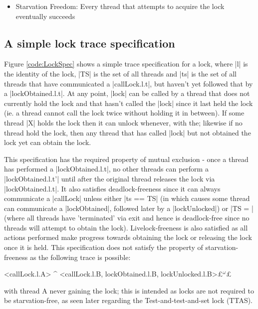 \begin{itemize}
\begin{cspm}
  \end{cspm}
  \item Starvation Freedom: Every thread that attempts to acquire the lock eventually succeeds 
  
\end{itemize}

\subsection{A simple lock trace specification}

Figure \ref{code:LockSpec} shows a simple trace specification for a lock, where |l| is the identity of the lock, |TS| is the set of all threads and |ts| is the set of all threads that have communicated a |callLock.l.t|, but haven't yet followed that by a |lockObtained.l.t|. At any point, |lock| can be called by a thread that does not currently hold the lock and that hasn't called the |lock| since it last held the lock (ie. a thread cannot call the lock twice without holding it in between). If some thread |X| holds the lock then it can unlock whenever, with the; likewise if no thread hold the lock, then any thread that has called |lock| but not obtained the lock yet can obtain the lock.

This specification has the required property of mutual exclusion - once a thread has performed a |lockObtained.l.t|, no other threads can perform a |lockObtained.l.t'| until after the original thread releases the lock via |lockObtained.l.t|. It also satisfies deadlock-freeness since it can always communicate a |callLock| unless either |ts == TS| (in which causes some thread can communicate a |lockObtained|, followed later by a |lockUnlocked|) or |TS = {}| (where all threads have 'terminated' via exit and hence is deadlock-free since no threads will attempt to obtain the lock). Livelock-freeness is also satisfied as all actions performed make progress towards obtaining the lock or releasing the lock once it is held. This specification does not satisfy the property of starvation-freeness as the following trace is possible:
\begin{cspm}
  <callLock.l.A> ^ <callLock.l.B, lockObtained.l.B, lockUnlocked.l.B>£$^\omega$£
\end{cspm}
with thread A never gaining the lock; this is intended as locks are not required to be starvation-free, as seen later regarding the Test-and-test-and-set lock (TTAS).

